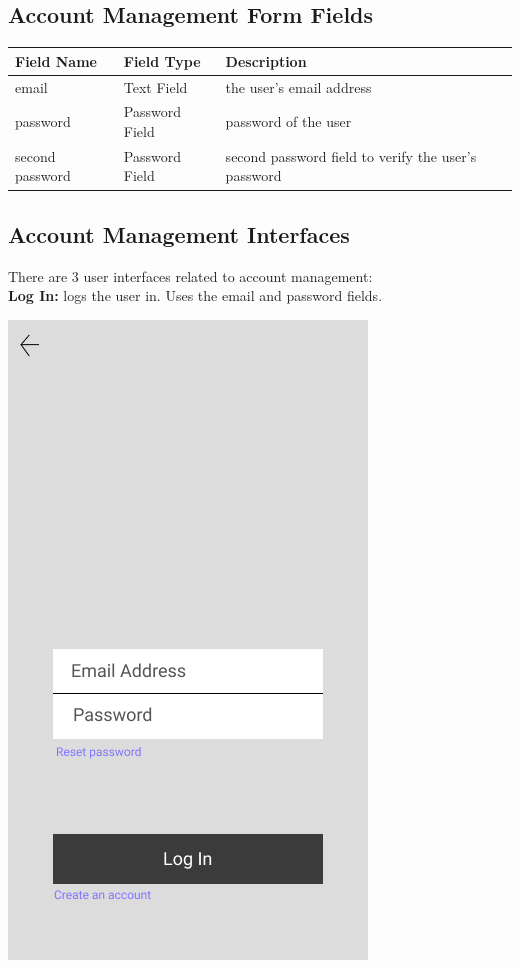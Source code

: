 \documentclass{scrreprt}
\begin{document}
\subsection{Account Management Form Fields}
\begin{center}
\begin{longtable}{ | p{3cm} | p{4cm} | p{8cm} | }
\hline
\textbf{Field Name} & \textbf{Field Type} & \textbf{Description} \\
\hline
email & Text Field & the user's email address \\
\hline
password & Password Field & password of the user \\
\hline
second password & Password Field & second password field to verify the user's password\\
\hline
\end{longtable}
\end{center}

\subsection{Account Management Interfaces}
There are 3 user interfaces related to account management:\\
\textbf{Log In:}
logs the user in.  Uses the email and password fields.
\begin{center}
\includegraphics[scale=0.4]{login.png}
\end{center}
\end{document}
